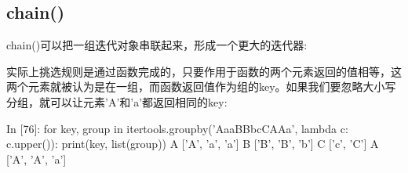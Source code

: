 \subsection{chain()}
chain()可以把一组迭代对象串联起来，形成一个更大的迭代器:
实际上挑选规则是通过函数完成的，只要作用于函数的两个元素返回的值相等，这两个元素就被认为是在一组，而函数返回值作为组的key。如果我们要忽略大小写分组，就可以让元素'A'和'a'都返回相同的key:
\begin{python}
In [76]: for key, group in itertools.groupby('AaaBBbcCAAa', lambda c: c.upper()):
            print(key, list(group))
	A ['A', 'a', 'a']
	B ['B', 'B', 'b']
	C ['c', 'C']
	A ['A', 'A', 'a']

\end{python}

